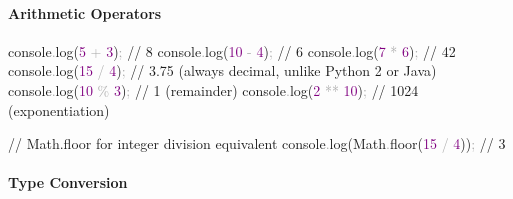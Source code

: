 \documentclass[
  justified,
  openright,
]{tufte-book}
\let\subsubsection\paragraph
\let\paragraph\paragraph
\newcommand{\BuiltInTok}[1]{#1}
\newcommand{\CommentTok}[1]{\textcolor{MidGray}{#1}}
\newcommand{\DecValTok}[1]{\textcolor{Purple}{#1}}
\newcommand{\FunctionTok}[1]{\textcolor{BrandBlue}{#1}}
\newcommand{\NormalTok}[1]{#1}
\newcommand{\OperatorTok}[1]{\textcolor{DarkGray}{#1}}
\newenvironment{Shaded}{%
  \begin{snugshade}
}{%
  \end{snugshade}
}
\let\subsubsection\paragraph
\let\paragraph\paragraph
\begin{document}
\subsubsection{Arithmetic Operators}\label{arithmetic-operators}

\begin{Shaded}
\begin{Highlighting}[]
\BuiltInTok{console}\OperatorTok{.}\FunctionTok{log}\NormalTok{(}\DecValTok{5} \OperatorTok{+} \DecValTok{3}\NormalTok{)}\OperatorTok{;} \CommentTok{// 8}
\BuiltInTok{console}\OperatorTok{.}\FunctionTok{log}\NormalTok{(}\DecValTok{10} \OperatorTok{{-}} \DecValTok{4}\NormalTok{)}\OperatorTok{;} \CommentTok{// 6}
\BuiltInTok{console}\OperatorTok{.}\FunctionTok{log}\NormalTok{(}\DecValTok{7} \OperatorTok{*} \DecValTok{6}\NormalTok{)}\OperatorTok{;} \CommentTok{// 42}
\BuiltInTok{console}\OperatorTok{.}\FunctionTok{log}\NormalTok{(}\DecValTok{15} \OperatorTok{/} \DecValTok{4}\NormalTok{)}\OperatorTok{;} \CommentTok{// 3.75  (always decimal, unlike Python 2 or Java)}
\BuiltInTok{console}\OperatorTok{.}\FunctionTok{log}\NormalTok{(}\DecValTok{10} \OperatorTok{\%} \DecValTok{3}\NormalTok{)}\OperatorTok{;} \CommentTok{// 1  (remainder)}
\BuiltInTok{console}\OperatorTok{.}\FunctionTok{log}\NormalTok{(}\DecValTok{2} \OperatorTok{**} \DecValTok{10}\NormalTok{)}\OperatorTok{;} \CommentTok{// 1024  (exponentiation)}

\CommentTok{// Math.floor for integer division equivalent}
\BuiltInTok{console}\OperatorTok{.}\FunctionTok{log}\NormalTok{(}\BuiltInTok{Math}\OperatorTok{.}\FunctionTok{floor}\NormalTok{(}\DecValTok{15} \OperatorTok{/} \DecValTok{4}\NormalTok{))}\OperatorTok{;} \CommentTok{// 3}
\end{Highlighting}
\end{Shaded}

\subsubsection{Type Conversion}\label{type-conversion}
\end{document}
